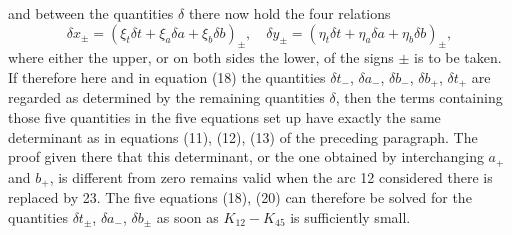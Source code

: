 \documentclass[11pt,a4paper,leqno]{article}
\begin{document}
and between the quantities $\delta$ there now hold the four relations
\begin{equation}\tag{20}
\delta x_\pm=(\xi_t\delta t+\xi_a\delta a+\xi_b\delta b)_\pm,
\quad
\delta y_\pm=(\eta_t\delta t+\eta_a\delta a+\eta_b\delta b)_\pm,
\end{equation}
where either the upper, or on both sides the lower, of the signs $\pm$ is to be taken. If therefore here and in equation (18) the quantities $\delta t_-$, $\delta a_-$, $\delta b_-$, $\delta b_+$, $\delta t_+$ are regarded as determined by the remaining quantities $\delta$, then the terms containing those five quantities in the five equations set up have exactly the same determinant as in equations (11), (12), (13) of the preceding paragraph. The proof given there that this determinant, or the one obtained by interchanging $a_+$ and $b_+$, is different from zero remains valid when the arc 12 considered there is replaced by 23. The five equations (18), (20) can therefore be solved for the quantities $\delta t_\pm$, $\delta a_-$, $\delta b_\pm$ as soon as $K_{12}-K_{45}$ is sufficiently small.
\end{document}
